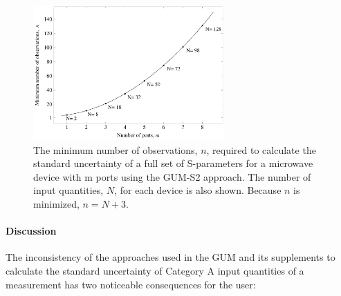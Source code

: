 \documentclass[../thesis/thesis.tex]{subfiles}
\begin{document}
\begin{refsection}
\begin{figure}
	\centering
	\includegraphics[width=0.65\textwidth]{gum_sparams}
	\caption{The minimum number of observations, $n$, required to calculate the standard uncertainty of a full set of S-parameters for a microwave device with m ports using the GUM-S2 approach. The number of input quantities, $N$, for each device is also shown. Because $n$ is minimized, $n = N + 3$.}
	\label{ch3_fig_gum_sparams}
\end{figure}

\paragraph{Discussion}

The inconsistency of the approaches used in the GUM and its supplements to calculate the standard uncertainty of Category A input quantities of a measurement has two noticeable consequences for the user:


\end{refsection}
\end{document}
